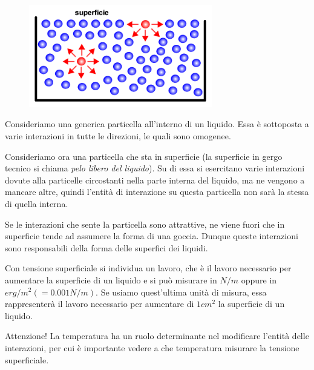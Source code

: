 \begin{figure}[htp]
    \centering
    \includegraphics[width=8cm]{immagini/tensione_superficiale.png}
\end{figure}

Consideriamo una generica particella all'interno di un liquido. Essa è sottoposta a varie interazioni in tutte le direzioni, le quali sono omogenee. 
    
Consideriamo ora una particella che sta in superficie (la superficie in gergo tecnico si chiama \textit{pelo libero del liquido}). Su di essa si esercitano varie interazioni dovute alla particelle circostanti nella parte interna del liquido, ma ne vengono a mancare altre, quindi l'entità di interazione su questa particella non sarà la stessa di quella interna.

Se le interazioni che sente la particella sono attrattive, ne viene fuori che in superficie tende ad assumere la forma di una goccia. Dunque queste interazioni sono responsabili della forma delle superfici dei liquidi.

Con tensione superficiale si individua un lavoro, che è il lavoro necessario per aumentare la superficie di un liquido e si può misurare in $N/m$ oppure in $erg/m^2(=0.001N/m)$. Se usiamo quest'ultima unità di misura, essa rappresenterà il lavoro necessario per aumentare di $1cm^2$  la superficie di un liquido.

Attenzione! La temperatura ha un ruolo determinante nel modificare l'entità delle interazioni, per cui è importante vedere a che temperatura misurare la tensione superficiale.

